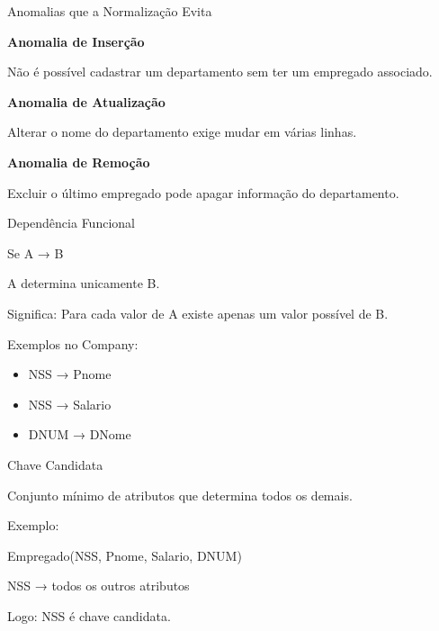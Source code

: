 \documentclass{beamer}
\begin{document}
\begin{frame}{Anomalias que a Normalização Evita}

\textbf{Anomalia de Inserção}

Não é possível cadastrar um departamento
sem ter um empregado associado.

\textbf{Anomalia de Atualização}

Alterar o nome do departamento exige
mudar em várias linhas.

\textbf{Anomalia de Remoção}

Excluir o último empregado pode apagar
informação do departamento.

\end{frame}





\begin{frame}{Dependência Funcional}

Se A → B

A determina unicamente B.

Significa:
Para cada valor de A existe
apenas um valor possível de B.

Exemplos no Company:

\begin{itemize}
\item NSS → Pnome
\item NSS → Salario
\item DNUM → DNome
\end{itemize}

\end{frame}





\begin{frame}{Chave Candidata}

Conjunto mínimo de atributos
que determina todos os demais.

Exemplo:

Empregado(NSS, Pnome, Salario, DNUM)

NSS → todos os outros atributos

Logo:
NSS é chave candidata.

\end{frame}
\end{document}
